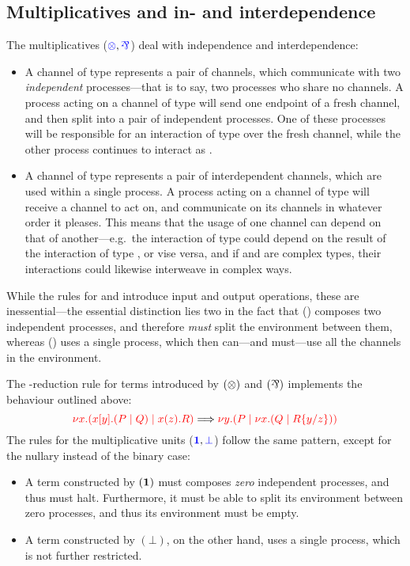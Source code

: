 \subsection{Multiplicatives and in- and interdependence}
\label{sec:cp-multiplicatives}
The multiplicatives ($\ty{\tens}, \ty{\parr}$) deal with independence and
interdependence:
\begin{itemize}
\item
  A channel of type  represents a pair of channels, which
  communicate with two \emph{independent} processes---that is to say, two
  processes who share no channels.
  A process acting on a channel of type  will send one endpoint of
  a fresh channel, and then split into a pair of independent processes.
  One of these processes will be responsible for an interaction of type 
  over the fresh channel, while the other process continues to interact as
  .
\item
  A channel of type  represents a pair of interdependent channels,
  which are used within a single process.
  A process acting on a channel of type  will receive a channel to
  act on, and communicate on its channels in whatever order it pleases.
  This means that the usage of one channel can depend on that of
  another---e.g.\ the interaction of type  could depend on the result of
  the interaction of type , or vise versa, and if  and  are
  complex types, their interactions could likewise interweave in complex ways.
\end{itemize}
While the rules for \ty{\tens} and \ty{\parr} introduce input and output
operations, these are inessential---the essential distinction lies two in the
fact that (\tens) composes two independent processes, and therefore \emph{must}
split the environment between them, whereas (\parr) uses a single process, which
then can---and must---use all the channels in the environment.
\begin{center}
  \cpInfTens
  \cpInfParr
\end{center}
The \textbeta-reduction rule for terms introduced by $(\tens)$ and $(\parr)$
implements the behaviour outlined above:
\[
  \tm{\cpCut{x}{\cpSend{x}{y}{P}{Q}}{\cpRecv{x}{z}{R}}}
  \Longrightarrow
  \tm{\cpCut{y}{P}{\cpCut{x}{Q}{\cpSub{y}{z}{R}}}}
\]
%
The rules for the multiplicative units ($\ty{\one}, \ty{\bot}$) follow the same
pattern, except for the nullary instead of the binary case:
\begin{itemize}
\item
  A term constructed by $(\one)$ must composes \emph{zero} independent
  processes, and thus must halt. Furthermore, it must be able to split its
  environment between zero processes, and thus its environment must be empty.
\item
  A term constructed by $(\bot)$, on the other hand, uses a single process,
  which is not further restricted.
\end{itemize}
